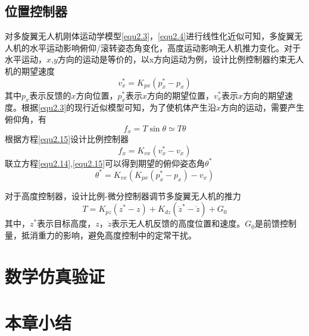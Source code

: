 \subsection{位置控制器}
对多旋翼无人机刚体运动学模型\eqref{equ2.3}，\eqref{equ2.4}进行线性化近似可知，多旋翼无人机的水平运动影响俯仰/滚转姿态角变化，高度运动影响无人机推力变化。对于水平运动，$x$,$y$方向的运动是等价的，以x方向运动为例，设计比例控制器约束无人机的期望速度
\begin{equation}
\label{equ2.14}
v_x^* =  K_{px} \left( p_x^* - p_x \right)
\end{equation}
其中$p_x $表示反馈的$x$方向位置，$p_x^*$表示$x$方向的期望位置，$v_x^*$表示$x$方向的期望速度。根据\eqref{equ2.3}的现行近似模型可知，为了使机体产生沿$x$方向的运动，需要产生俯仰角，有
\begin{equation}
\label{equ2.15}
f_x = T \sin\theta \simeq T \theta
\end{equation}
根据方程\eqref{equ2.15}设计比例控制器
\begin{equation}
f_x = K_{vx} \left(  v_x^* - v_x \right)
\end{equation}
联立方程\eqref{equ2.14},\eqref{equ2.15}可以得到期望的俯仰姿态角$\theta^*$
\begin{equation}
\label{equ2.16}
\theta^* = K_{vx} \left( K_{px} \left( p_x^* - p_x \right) - v_x \right)
\end{equation}

对于高度控制器，设计比例-微分控制器调节多旋翼无人机的推力
\begin{equation}
\label{equ2.17}
T = K_{pz} \left( z^* -z  \right) + K_{dz} \left( \dot{z}^* - \dot{z}  \right) + G_0
\end{equation}
其中，$z^*$表示目标高度，$z$，$\dot{z}$表示无人机反馈的高度位置和速度。$G_0$是前馈控制量，抵消重力的影响，避免高度控制中的定常干扰。

\section{ 数学仿真验证}



\section{本章小结}



